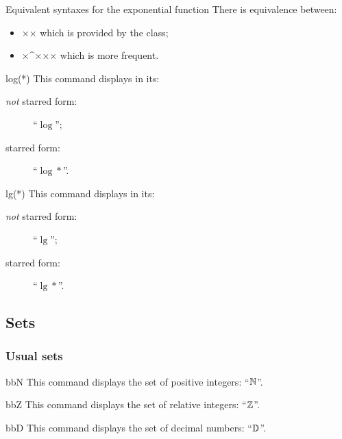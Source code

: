 \documentclass[english,nolocaltoc]{nwejmart}
\newtheorem[style=definition]{fact}
\newtheorem[title=experience]{experience}
\newtheorem[title-plural=rings]{ring}
\newtheorem[title=ideal,title-plural=ideals]{ideal}
\begin{document}
\begin{dbremark}{Equivalent syntaxes  for the exponential function}{}
  There is equivalence between:
  \begin{itemize}
  \item ×× which is provided by the class;
  \item ×\E^{××}× which is more frequent.
\end{itemize}
\end{dbremark}

\begin{docCommand}{log(*)}{}
  This command displays in its:
  \begin{description}
  \item[\emph{not} starred form:] \enquote{$\log$};
  \item[starred form:] \enquote{$\log*$}.
  \end{description}
\end{docCommand}

\begin{docCommand}{lg(*)}{}
  This command displays in its: 
  \begin{description}
  \item[\emph{not} starred form:] \enquote{$\lg$};
  \item[starred form:] \enquote{$\lg*$}.
  \end{description}
\end{docCommand}

\subsection{Sets}

\subsubsection{Usual sets}

\begin{docCommand}{bbN}{}
  This  command displays the set of positive integers:
  \enquote{$\mathbb{N}$}.
\end{docCommand}

\begin{docCommand}{bbZ}{}
  This  command displays the set of relative integers:
  \enquote{$\mathbb{Z}$}.
\end{docCommand}

\begin{docCommand}{bbD}{}
  This  command displays the set of decimal numbers: \enquote{$\mathbb{D}$}.
\end{docCommand}
\end{document}
